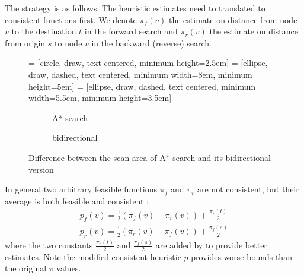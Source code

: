The strategy is as follows. The heuristic estimates need to translated to consistent functions first. 
We denote $\pi_f(v)$ the estimate on distance from node $v$ to the destination $t$ in the forward search and $\pi_r(v)$ the estimate on distance from origin $s$ to node $v$ in the backward (reverse) search.
\begin{figure}[H]
     = [circle, draw, text centered, minimum height=2.5em]
     = [ellipse, draw, dashed, text centered, minimum width=8em, minimum height=5em]
     = [ellipse, draw, dashed, text centered, minimum width=5.5em, minimum height=3.5em]
    \centering
    \begin{subfigure}[t]{.4\textwidth}
        \centering
        \caption{A* search}
    \end{subfigure}
    \begin{subfigure}[t]{.4\textwidth}
        \centering
        \caption{bidirectional}
    \end{subfigure}
    \caption{Difference between the scan area of A* search and its bidirectional version}
\end{figure}
In general two arbitrary feasible functions $\pi_f$ and $\pi_r$ are not consistent, but their average is both feasible and consistent \citep{Ikeda}:
\begin{align}
    p_f(v) = \frac{1}{2}(\pi_f(v)-\pi_r(v)) + \frac{\pi_r(t)}{2} \\
    p_r(v) = \frac{1}{2}(\pi_r(v)-\pi_f(v)) + \frac{\pi_f(s)}{2} 
\end{align}
where the two constants $\frac{\pi_r(t)}{2}$ and $\frac{\pi_f(s)}{2}$ are added by \citet{GoldbergEPP} to provide better estimates.
Note the modified consistent heuristic $p$ provides worse bounds than the original $\pi$ values.

